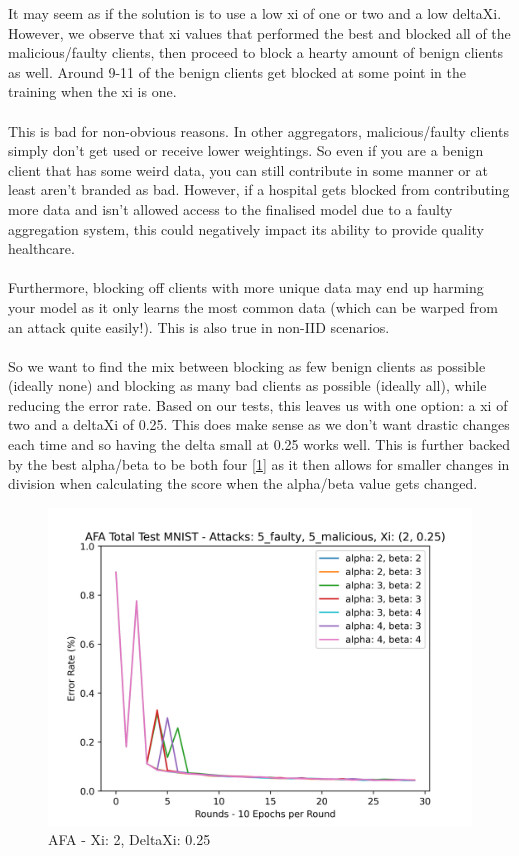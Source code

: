 It may seem as if the solution is to use a low xi of one or two and a low deltaXi. 
However, we observe that xi values that performed the best and blocked all of the malicious/faulty clients, then proceed to block a hearty amount of benign clients as well.
Around 9-11 of the benign clients get blocked at some point in the training when the xi is one.
\\ \\
This is bad for non-obvious reasons. 
In other aggregators, malicious/faulty clients simply don't get used or receive lower weightings. 
So even if you are a benign client that has some weird data, you can still contribute in some manner or at least aren't branded as bad. 
However, if a hospital gets blocked from contributing more data and isn't allowed access to the finalised model due to a faulty aggregation system, this could negatively impact its ability to provide quality healthcare.
\\ \\
Furthermore, blocking off clients with more unique data may end up harming your model as it only learns the most common data (which can be warped from an attack quite easily!). This is also true in non-IID scenarios.
\\ \\
So we want to find the mix between blocking as few benign clients as possible (ideally none) and blocking as many bad clients as possible (ideally all), while reducing the error rate.
Based on our tests, this leaves us with one option: a xi of two and a deltaXi of 0.25.
This does make sense as we don't want drastic changes each time and so having the delta small at 0.25 works well. 
This is further backed by the best alpha/beta to be both four [\ref{fig:best_afa}] as it then allows for smaller changes in division when calculating the score when the alpha/beta value gets changed.

\begin{figure}[htbp]
	\centering
    \includegraphics[scale=0.7]{initial/graphs/best_afa.png}
	\caption{AFA - Xi: 2, DeltaXi: 0.25}
	\label{fig:best_afa}
\end{figure}


